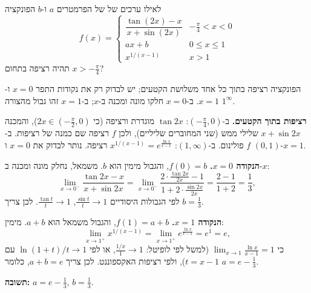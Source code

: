 
\begin{question}
לאילו ערכים של של הפרמטרים $a$ ו-$b$ הפונקציה
\[
f(x)=\begin{cases}\dfrac{\tan(2x)-x}{x+\sin(2x)} & -\frac\pi4<x<0\\[1ex] ax+b & 0\le x\le1\\[0.5ex] x^{1/(x-1)} & x>1\end{cases}
\]
תהיה רציפה בתחום $x>-\frac\pi4$?
\end{question}

\begin{hint}
הפונקציה רציפה בתוך כל אחד משלושת הקטעים; יש לבדוק רק את נקודות התפר $x=0$ ו-$x=1$. ב-$x=0$ חלקו מונה ומכנה ב-$x$; ב-$x=1$ זהו גבול מהצורה $1^\infty$.
\end{hint}

\begin{solution}
\textbf{רציפות בתוך הקטעים.} ב-$\left(-\frac\pi4,0\right)$: $\tan2x$ מוגדרת ורציפה (כי $2x\in\left(-\frac\pi2,0\right)$), והמכנה $x+\sin2x$ שלילי ממש (שני המחוברים שליליים), ולכן $f$ רציפה שם כמנה של רציפות. ב-$(0,1)$ $f$ פולינום. ב-$(1,\infty)$: $x^{1/(x-1)}=e^{\frac{\ln x}{x-1}}$ רציפה. נותר לבדוק את $x=0$ ו-$x=1$.

\textbf{הנקודה $x=0$.} $f(0)=b$, והגבול מימין הוא $b$. משמאל, נחלק מונה ומכנה ב-$x$:
\[
\lim_{x\to0^-}\frac{\tan2x-x}{x+\sin2x}=\lim_{x\to0^-}\frac{2\cdot\frac{\tan2x}{2x}-1}{1+2\cdot\frac{\sin2x}{2x}}=\frac{2-1}{1+2}=\frac13,
\]
לפי הגבולות היסודיים $\frac{\sin t}{t}\to1$, $\frac{\tan t}{t}\to1$. לכן צריך $b=\frac13$.

\textbf{הנקודה $x=1$.} $f(1)=a+b$, והגבול משמאל הוא $a+b$. מימין:
\[
\lim_{x\to1^+}x^{1/(x-1)}=\lim_{x\to1^+}e^{\frac{\ln x}{x-1}}=e^1=e,
\]
כי $\lim_{x\to1}\frac{\ln x}{x-1}=1$ (למשל לפי לופיטל: $\frac{1/x}{1}\to1$, או לפי $\ln(1+t)/t\to1$ עם $t=x-1$), ולפי רציפות האקספוננט. לכן צריך $a+b=e$, כלומר $a=e-\frac13$.

\textbf{תשובה:} $a=e-\frac13$, $b=\frac13$.
\end{solution}

